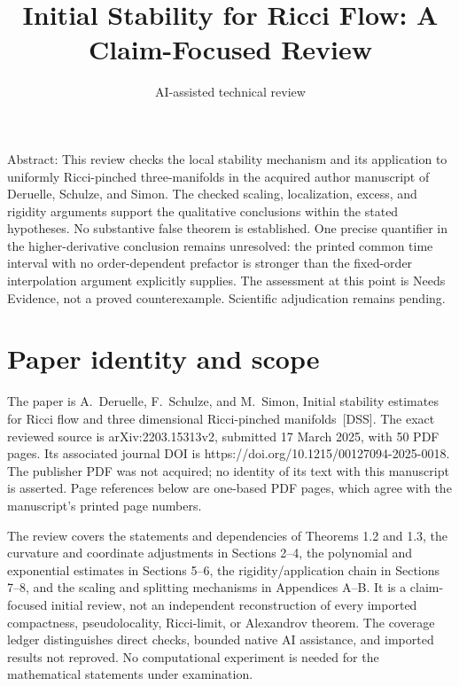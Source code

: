 \documentclass[10pt]{article}
\title{Initial Stability for Ricci Flow: A Claim-Focused Review}
\author{AI-assisted technical review}
\date{}
\begin{document}
\maketitle
Abstract: This review checks the local stability mechanism and its application to uniformly Ricci-pinched three-manifolds in the acquired author manuscript of Deruelle, Schulze, and Simon. The checked scaling, localization, excess, and rigidity arguments support the qualitative conclusions within the stated hypotheses. No substantive false theorem is established. One precise quantifier in the higher-derivative conclusion remains unresolved: the printed common time interval with no order-dependent prefactor is stronger than the fixed-order interpolation argument explicitly supplies. The assessment at this point is Needs Evidence, not a proved counterexample. Scientific adjudication remains pending.\par
\section*{Paper identity and scope}
The paper is A. Deruelle, F. Schulze, and M. Simon, Initial stability estimates for Ricci flow and three dimensional Ricci-pinched manifolds [DSS]. The exact reviewed source is arXiv:2203.15313v2, submitted 17 March 2025, with 50 PDF pages. Its associated journal DOI is https://doi.org/10.1215/00127094-2025-0018. The publisher PDF was not acquired; no identity of its text with this manuscript is asserted. Page references below are one-based PDF pages, which agree with the manuscript’s printed page numbers.\par
The review covers the statements and dependencies of Theorems 1.2 and 1.3, the curvature and coordinate adjustments in Sections 2–4, the polynomial and exponential estimates in Sections 5–6, the rigidity/application chain in Sections 7–8, and the scaling and splitting mechanisms in Appendices A–B. It is a claim-focused initial review, not an independent reconstruction of every imported compactness, pseudolocality, Ricci-limit, or Alexandrov theorem. The coverage ledger distinguishes direct checks, bounded native AI assistance, and imported results not reproved. No computational experiment is needed for the mathematical statements under examination.\par
\end{document}
